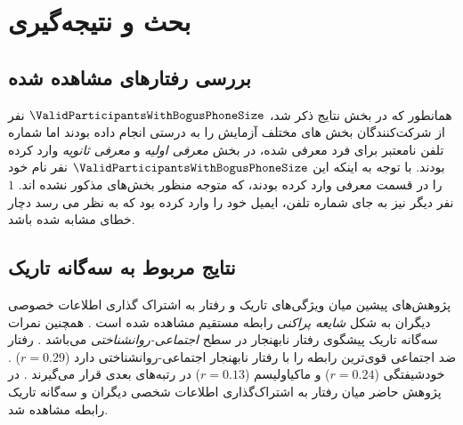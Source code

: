 \chapter{بحث و نتیجه‌گیری}
\section{بررسی رفتارهای مشاهده شده }
همانطور که در بخش نتایج ذکر شد،
$\ValidParticipantsWithBogusPhoneSize$
نفر  از شرکت‌کنندگان
بخش های مختلف آزمایش را به درستی انجام داده بودند اما شماره تلفن نامعتبر
برای فرد معرفی شده، در بخش‌
\textit{معرفی اولیه}
و
\textit{معرفی ثانویه}
وارد کرده بودند. با توجه به اینکه این $\ValidParticipantsWithBogusPhoneSize$
نفر نام
خود را در قسمت معرفی وارد کرده بودند، که متوجه منظور بخش‌های مذکور نشده اند.
$1$
نفر دیگر نیز به جای شماره تلفن، ایمیل خود را وارد کرده بود که به نظر می رسد دچار خطای مشابه
شده باشد.
\section{نتایج مربوط به سه‌گانه تاریک}
پژوهش‌های پیشین میان ویژگی‌های تاریک و رفتار
به اشتراک گذاری اطلاعات خصوصی دیگران به شکل
\textit{
    شایعه پراکنی
}
رابطه مستقیم مشاهده شده است
\!\citep{hartungBetterItsReputation2019}
\!.
همچنین نمرات سه‌گانه تاریک پیشگوی رفتار نابهنجار در سطح
\textit{
    اجتماعی-روانشناختی
}
می‌باشد
\!\citep{murisMalevolentSideHuman2017}
\!.
رفتار ضد اجتماعی قوی‌ترین رابطه را با رفتار نابهنجار اجتماعی-روانشناختی دارد
($r = 0.29$)
\!. خودشیفتگی
($r = 0.24$)
و ماکیاولیسم
($r = 0.13$)
در رتبه‌های بعدی قرار می‌گیرند
\!.
در پژوهش حاضر میان رفتار به اشتراک‌گذاری اطلاعات شخصی دیگران و سه‌گانه تاریک رابطه مشاهده شد.


